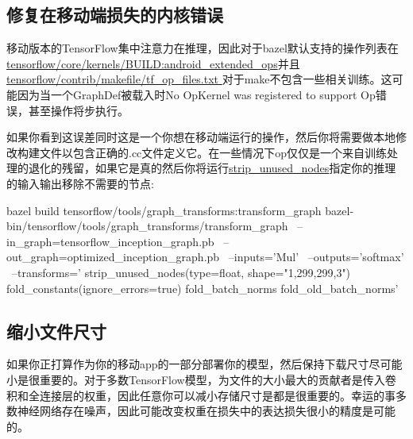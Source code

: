 \subsection{修复在移动端损失的内核错误}
移动版本的TensorFlow集中注意力在推理，因此对于bazel默认支持的操作列表在\href{https://github.com/tensorflow/tensorflow/blob/master/tensorflow/core/kernels/BUILD}{tensorflow/core/kernels/BUILD:android_extended_ops}并且\href{https://github.com/tensorflow/tensorflow/blob/master/tensorflow/contrib/makefile/tf_op_files.txt}{tensorflow/contrib/makefile/tf\_op\_files.txt }对于make不包含一些相关训练。这可能因为当一个GraphDef被载入时No OpKernel was registered to support Op错误，甚至操作将步执行。

如果你看到这误差同时这是一个你想在移动端运行的操作，然后你将需要做本地修改构建文件以包含正确的.cc文件定义它。在一些情况下op仅仅是一个来自训练处理的退化的残留，如果它是真的然后你将运行\href{https://github.com/tensorflow/tensorflow/blob/r1.4/tensorflow/tools/graph_transforms/README.md#strip_unused_nodes}{strip\_unused\_nodes}指定你的推理的输入输出移除不需要的节点:
\begin{bashcode}
bazel build tensorflow/tools/graph_transforms:transform_graph
bazel-bin/tensorflow/tools/graph_transforms/transform_graph \
--in_graph=tensorflow_inception_graph.pb \
--out_graph=optimized_inception_graph.pb \
--inputs='Mul' \
--outputs='softmax' \
--transforms='
  strip_unused_nodes(type=float, shape="1,299,299,3")
  fold_constants(ignore_errors=true)
  fold_batch_norms
  fold_old_batch_norms'
\end{bashcode}
\subsection{缩小文件尺寸}
如果你正打算作为你的移动app的一部分部署你的模型，然后保持下载尺寸尽可能小是很重要的。对于多数TensorFlow模型，为文件的大小最大的贡献者是传入卷积和全连接层的权重，因此任意你可以减小存储尺寸是都是很重要的。幸运的事多数神经网络存在噪声，因此可能改变权重在损失中的表达损失很小的精度是可能的。

